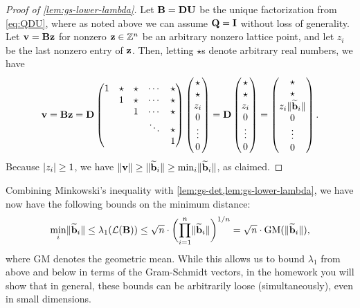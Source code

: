 \documentclass[11pt]{article}
\begin{document}
\begin{proof}[Proof of \cref{lem:gs-lower-lambda}]
  Let $\mathbf{B} = \mathbf{D} \mathbf{U}$ be the unique factorization from
  \cref{eq:QDU}, where as noted above we can assume $\mathbf{Q} = \mathbf{I}$
  without loss of generality. Let $\mathbf{v} = \mathbf{B} \mathbf{z}$ for nonzero
  $\mathbf{z} \in \mathbb{Z}^{n}$ be an arbitrary nonzero lattice point, and let
  $z_i$ be the last nonzero entry of $\mathbf{z}$. Then, letting $\star$s
  denote arbitrary real numbers, we have
  \begin{equation}
    \mathbf{v} = \mathbf{B} \mathbf{z} = \mathbf{D}
    \begin{pmatrix}
      1& \star & \star & \cdots & \star\\
       & 1 & \star  & \cdots  & \star\\
       & & 1 & \cdots  & \star\\
       & & & \ddots & \star\\
       & & & & 1
    \end{pmatrix}
    \begin{pmatrix}
      \star\\
      \star\\
      z_i\\
      0\\
      \vdots\\
      0
    \end{pmatrix} = \mathbf{D}
    \begin{pmatrix}
      \star \\
      \star \\
      z_i\\
      0\\
      \vdots\\
      0
    \end{pmatrix} =
    \begin{pmatrix}
      \star \\
      \star \\
      z_{i} \lVert \widetilde{\mathbf{b}}_i\rVert \\
      0\\
      \vdots\\
      0
    \end{pmatrix}.
  \end{equation}
  Because $\lvert z_{i}\rvert \geq 1$, we have
  $\lVert\mathbf{v}\rVert \geq \lVert\widetilde{\mathbf{b}}_{i}\rVert \geq \min_{i}
  \lVert\widetilde{\mathbf{b}}_{i}\rVert$, as claimed.
\end{proof}

Combining Minkowski's inequality with
\cref{lem:gs-det,lem:gs-lower-lambda}, we have now have the following
bounds on the minimum distance:
\begin{equation}
  \label{eq:lambda-bounds-gs}
  \min_i \length{ \gs{\vecb}_i}  \leq \lambda_1(\lat(\matB)) \leq
  \sqrt{n} \cdot \parens[\bigg]{\prod_{i=1}^{n}
    \length{\gs{\vecb}_{i}}}^{1/n} = \sqrt{n} \cdot
  \text{GM}(\length{\gs{\vecb}_{i}}),
\end{equation}
where $\text{GM}$ denotes the geometric mean. While this allows us to
bound $\lambda_{1}$ from above and below in terms of the Gram-Schmidt
vectors, in the homework you will show that in general, these bounds
can be arbitrarily loose (simultaneously), even in small dimensions.
\end{document}
